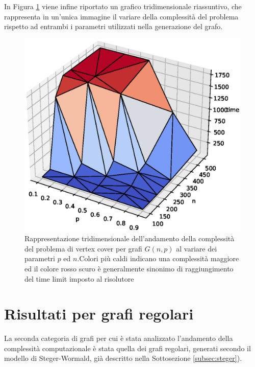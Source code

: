 In Figura \ref{fig:gnp3d} viene infine riportato un grafico tridimensionale riassuntivo, che rappresenta in un'unica immagine il variare della complessità del problema rispetto ad entrambi i parametri utilizzati nella generazione del grafo.
\vspace{-1cm}
\begin{figure}[h!]
     \centering
       \includegraphics[scale=0.5]{images/gnp-3d.eps}
       \vspace{-0.8cm}
       \caption{Rappresentazione tridimensionale dell'andamento della complessità del problema di vertex cover per grafi $G(n,p)$ al variare dei parametri $p$ ed $n$.Colori più caldi indicano una complessità maggiore ed il colore rosso scuro è generalmente sinonimo di raggiungimento del time limit imposto al risolutore}
        \label{fig:gnp3d}
\end{figure}


\section{Risultati per grafi regolari}
La seconda categoria di grafi per cui è stata analizzato l'andamento della complessità computazionale è stata quella dei grafi regolari, generati secondo il modello di Steger-Wormald, già descritto nella Sottosezione \ref{subsec:steger}).

